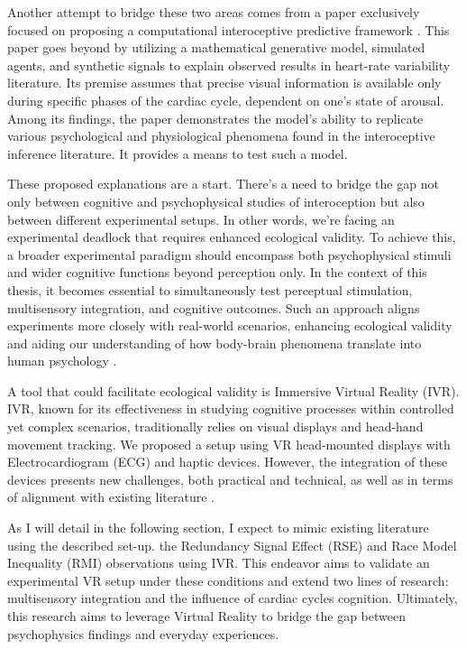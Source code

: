 \documentclass[12pt,oneside,openright]{report}
\begin{document}
Another attempt to bridge these two areas comes from a paper exclusively focused on proposing a computational interoceptive predictive framework \parencite{Allen2022}. This paper goes beyond by utilizing a mathematical generative model, simulated agents, and synthetic signals to explain observed results in heart-rate variability literature. Its premise assumes that precise visual information is available only during specific phases of the cardiac cycle, dependent on one's state of arousal. Among its findings, the paper demonstrates the model's ability to replicate various psychological and physiological phenomena found in the interoceptive inference literature. It provides a means to test such a model.
 
These proposed explanations are a start. There's a need to bridge the gap not only between cognitive and psychophysical studies of interoception but also between different experimental setups. In other words, we're facing an experimental deadlock that requires enhanced ecological validity. To achieve this, a broader experimental paradigm should encompass both psychophysical stimuli and wider cognitive functions beyond perception only. In the context of this thesis, it becomes essential to simultaneously test perceptual stimulation, multisensory integration, and cognitive outcomes. Such an approach aligns experiments more closely with real-world scenarios, enhancing ecological validity and aiding our understanding of how body-brain phenomena translate into human psychology \parencite{schmuckler2001ecological}.

A tool that could facilitate ecological validity is Immersive Virtual Reality (IVR). IVR, known for its effectiveness in studying cognitive processes within controlled yet complex scenarios, traditionally relies on visual displays and head-hand movement tracking. We proposed a setup using VR head-mounted displays with Electrocardiogram (ECG) and haptic devices. However, the integration of these devices presents new challenges, both practical and technical, as well as in terms of alignment with existing literature \parencite{Klotzsche2023}.

As I will detail in the following section, I expect to mimic existing literature using the described set-up.  the Redundancy Signal Effect (RSE) and Race Model Inequality (RMI) observations using IVR. This endeavor aims to validate an experimental VR setup under these conditions and extend two lines of research: multisensory integration and the influence of cardiac cycles cognition. Ultimately, this research aims to leverage Virtual Reality to bridge the gap between psychophysics findings and everyday experiences.
\end{document}
